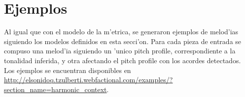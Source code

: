 \section{Ejemplos}
Al igual que con el modelo de la m'etrica, se generaron ejemplos de melod'ias siguiendo los modelos definidos en esta secci'on. Para 
cada pieza de entrada se compuso una melod'ia siguiendo un 'unico pitch profile, correspondiente a la tonalidad inferida, y otra
afectando el pitch profile con los acordes detectados. Los ejemplos se encuentran disponibles en 
\url{http://elsonidoq.tzulberti.webfactional.com/examples/?section_name=harmonic_context}.
